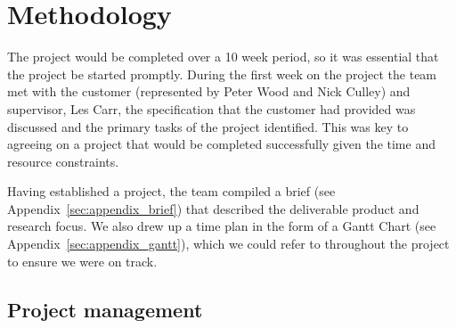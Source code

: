 \section{Methodology}

The project would be completed over a 10 week period, so it was essential that the project be started promptly. During the first week on the project the team met with the customer (represented by Peter Wood and Nick Culley) and supervisor, Les Carr, the specification that the customer had provided was discussed and the primary tasks of the project identified. This was key to agreeing on a project that would be completed successfully given the time and resource constraints.

Having established a project, the team compiled a brief (see Appendix~\ref{sec:appendix_brief}) that described the deliverable product and research focus. We also drew up a time plan in the form of a Gantt Chart (see Appendix~\ref{sec:appendix_gantt}), which we could refer to throughout the project to ensure we were on track.

\subsection{Project management}
 
